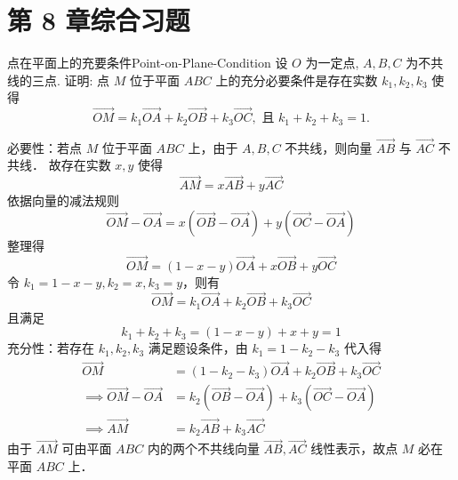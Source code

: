 \section{第 8 章综合习题}

\begin{problem}{点在平面上的充要条件}{Point-on-Plane-Condition}
    设 $O$ 为一定点, $A, B, C$ 为不共线的三点. 证明: 点 $M$ 位于平面 $ABC$ 上的充分必要条件是存在实数 $k_1, k_2, k_3$ 使得
    \begin{equation}
        \overrightarrow{OM} = k_1\overrightarrow{OA} + k_2\overrightarrow{OB} + k_3\overrightarrow{OC}, \text{ 且 } k_1 + k_2 + k_3 = 1.
    \end{equation}
\end{problem}

\begin{myproof}
    必要性：若点 $M$ 位于平面 $ABC$ 上，由于 $A, B, C$ 不共线，则向量 $\overrightarrow{AB}$ 与 $\overrightarrow{AC}$ 不共线．
    故存在实数 $x, y$ 使得
    \begin{equation}
        \overrightarrow{AM} = x\overrightarrow{AB} + y\overrightarrow{AC}
    \end{equation}
    依据向量的减法规则
    \begin{equation}
        \overrightarrow{OM} - \overrightarrow{OA} = x(\overrightarrow{OB} - \overrightarrow{OA}) + y(\overrightarrow{OC} - \overrightarrow{OA})
    \end{equation}
    整理得
    \begin{equation}
        \overrightarrow{OM} = (1 - x - y)\overrightarrow{OA} + x\overrightarrow{OB} + y\overrightarrow{OC}
    \end{equation}
    令 $k_1 = 1 - x - y, k_2 = x, k_3 = y$，则有
    \begin{equation}
        \overrightarrow{OM} = k_1\overrightarrow{OA} + k_2\overrightarrow{OB} + k_3\overrightarrow{OC}
    \end{equation}
    且满足
    \begin{equation}
        k_1 + k_2 + k_3 = (1 - x - y) + x + y = 1
    \end{equation}
    充分性：若存在 $k_1, k_2, k_3$ 满足题设条件，由 $k_1 = 1 - k_2 - k_3$ 代入得
    \begin{equation}
        \begin{aligned}
            \overrightarrow{OM}                                & = (1 - k_2 - k_3)\overrightarrow{OA} + k_2\overrightarrow{OB} + k_3\overrightarrow{OC}            \\
            \implies \overrightarrow{OM} - \overrightarrow{OA} & = k_2(\overrightarrow{OB} - \overrightarrow{OA}) + k_3(\overrightarrow{OC} - \overrightarrow{OA}) \\
            \implies \overrightarrow{AM}                       & = k_2\overrightarrow{AB} + k_3\overrightarrow{AC}
        \end{aligned}
    \end{equation}
    由于 $\overrightarrow{AM}$ 可由平面 $ABC$ 内的两个不共线向量 $\overrightarrow{AB}, \overrightarrow{AC}$ 线性表示，故点 $M$ 必在平面 $ABC$ 上．
\end{myproof}


